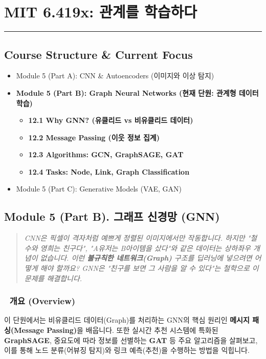\documentclass[11pt,a4paper]{book}
\theoremstyle{definition}
\begin{document}
\chapter{MIT 6.419x: 관계를 학습하다}
\label{ch:lecture12}


\vspace{1cm}
\hrule
\vspace{1cm}

\section*{Course Structure \& Current Focus}
\begin{itemize}
    \item Module 5 (Part A): CNN \& Autoencoders (이미지와 이상 탐지)
    \item \textbf{\textcolor{mainblue}{Module 5 (Part B): Graph Neural Networks (현재 단원: 관계형 데이터 학습)}}
    \begin{itemize}
        \item \textbf{12.1 Why GNN? (유클리드 vs 비유클리드 데이터)}
        \item \textbf{12.2 Message Passing (이웃 정보 집계)}
        \item \textbf{12.3 Algorithms: GCN, GraphSAGE, GAT}
        \item \textbf{12.4 Tasks: Node, Link, Graph Classification}
    \end{itemize}
    \item Module 5 (Part C): Generative Models (VAE, GAN)
\end{itemize}


\section{Module 5 (Part B). 그래프 신경망 (GNN)}

\begin{quote}
\textit{CNN은 픽셀이 격자처럼 예쁘게 정렬된 이미지에서만 작동합니다. 하지만 "철수와 영희는 친구다", "A유저는 B아이템을 샀다"와 같은 데이터는 상하좌우 개념이 없습니다. 이런 \textbf{불규칙한 네트워크(Graph)} 구조를 딥러닝에 넣으려면 어떻게 해야 할까요? GNN은 "친구를 보면 그 사람을 알 수 있다"는 철학으로 이 문제를 해결합니다.}
\end{quote}

\subsection*{📌 개요 (Overview)}
이 단원에서는 비유클리드 데이터(Graph)를 처리하는 GNN의 핵심 원리인 \textbf{메시지 패싱(Message Passing)}을 배웁니다. 또한 실시간 추천 시스템에 특화된 \textbf{GraphSAGE}, 중요도에 따라 정보를 선별하는 \textbf{GAT} 등 주요 알고리즘을 살펴보고, 이를 통해 노드 분류(어뷰징 탐지)와 링크 예측(추천)을 수행하는 방법을 익힙니다.
\end{document}
